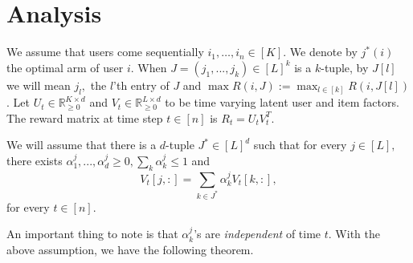 \newcommand\myworries[1]{\textcolor{red}{#1}}

\section{Analysis}
\label{sec:analysis}

We assume that users come sequentially $i_1, \dots, i_n \in [K]$. We denote by $j^*(i)$ the optimal arm of user $i$. When $J =(j_1,...,j_k) \in [L]^k$ is a $k$-tuple, by $J[l]$ we will mean $j_l,$ the $l$'th entry of $J$ and  $\max R(i, J) := \max_{l \in [k]} R(i,J[l])$.  Let $U_t \in \mathbb{R}_{\geq 0}^{K \times d}$ and $V_t \in \mathbb{R}_{\geq 0}^{L \times d}$ to be time varying latent user and item factors.
 The reward matrix at time step $t \in [n]$ is $R_t = U_t V_t^T.$
\begin{assumption}
We will assume that there is a $d$-tuple $J^{*} \in [L]^d$ such that for every  $j \in [L],$ there exists $\alpha_1^j,...,\alpha_d^j \geq 0, \sum_k \alpha_k^j \leq 1$ and
$$ V_t[j,:] = \sum_{k \in J^*} \alpha_k^j V_t[k,:], $$
for every $t \in [n]$.
\end{assumption}
 An important thing to note is that $\alpha_k^j$'s are {\it independent} of time $t.$
With the above assumption, we have the following theorem.  

